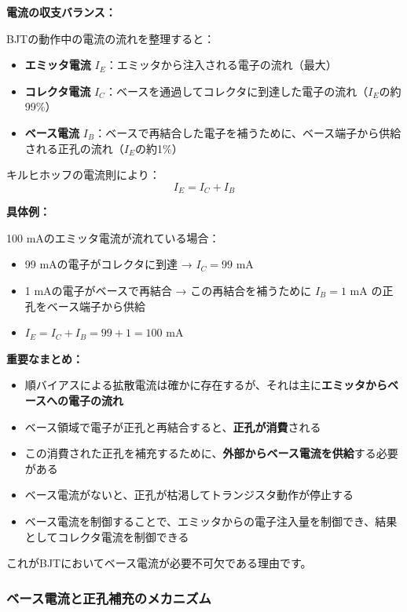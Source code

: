 \textbf{電流の収支バランス：}

BJTの動作中の電流の流れを整理すると：

\begin{itemize}
\item \textbf{エミッタ電流} $I_E$：エミッタから注入される電子の流れ（最大）
\item \textbf{コレクタ電流} $I_C$：ベースを通過してコレクタに到達した電子の流れ（$I_E$の約99\%）
\item \textbf{ベース電流} $I_B$：ベースで再結合した電子を補うために、ベース端子から供給される正孔の流れ（$I_E$の約1\%）
\end{itemize}

キルヒホッフの電流則により：
\begin{equation}
I_E = I_C + I_B
\end{equation}

\textbf{具体例：}

100 mAのエミッタ電流が流れている場合：
\begin{itemize}
\item 99 mAの電子がコレクタに到達 → $I_C = 99$ mA
\item 1 mAの電子がベースで再結合 → この再結合を補うために $I_B = 1$ mA の正孔をベース端子から供給
\item $I_E = I_C + I_B = 99 + 1 = 100$ mA
\end{itemize}

\textbf{重要なまとめ：}

\begin{itemize}
\item 順バイアスによる拡散電流は確かに存在するが、それは主に\textbf{エミッタからベースへの電子の流れ}
\item ベース領域で電子が正孔と再結合すると、\textbf{正孔が消費}される
\item この消費された正孔を補充するために、\textbf{外部からベース電流を供給}する必要がある
\item ベース電流がないと、正孔が枯渇してトランジスタ動作が停止する
\item ベース電流を制御することで、エミッタからの電子注入量を制御でき、結果としてコレクタ電流を制御できる
\end{itemize}

これがBJTにおいてベース電流が必要不可欠である理由です。

\subsubsection{ベース電流と正孔補充のメカニズム}

